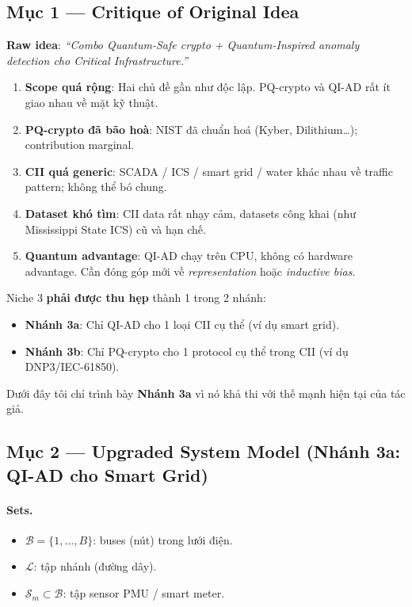 \documentclass[11pt,a4paper]{article}
\begin{document}
\subsection{Mục 1 --- Critique of Original Idea}

\textbf{Raw idea}: \textit{``Combo Quantum-Safe crypto + Quantum-Inspired anomaly detection cho Critical Infrastructure.''}

\begin{critique}
\begin{enumerate}
  \item \textbf{Scope quá rộng}: Hai chủ đề gần như độc lập. PQ-crypto và QI-AD rất ít giao nhau về mặt kỹ thuật.
  \item \textbf{PQ-crypto đã bão hoà}: NIST đã chuẩn hoá (Kyber, Dilithium\dots); contribution marginal.
  \item \textbf{CII quá generic}: SCADA / ICS / smart grid / water khác nhau về traffic pattern; không thể bó chung.
  \item \textbf{Dataset khó tìm}: CII data rất nhạy cảm, datasets công khai (như Mississippi State ICS) cũ và hạn chế.
  \item \textbf{Quantum advantage}: QI-AD chạy trên CPU, không có hardware advantage. Cần đóng góp mới về \textit{representation} hoặc \textit{inductive bias}.
\end{enumerate}
\end{critique}

\begin{critique}
Niche 3 \textbf{phải được thu hẹp} thành 1 trong 2 nhánh:
\begin{itemize}
  \item \textbf{Nhánh 3a}: Chỉ QI-AD cho 1 loại CII cụ thể (ví dụ smart grid).
  \item \textbf{Nhánh 3b}: Chỉ PQ-crypto cho 1 protocol cụ thể trong CII (ví dụ DNP3/IEC-61850).
\end{itemize}
Dưới đây tôi chỉ trình bày \textbf{Nhánh 3a} vì nó khả thi với thế mạnh hiện tại của tác giả.
\end{critique}

\subsection{Mục 2 --- Upgraded System Model (Nhánh 3a: QI-AD cho Smart Grid)}

\paragraph{Sets.}
\begin{itemize}
  \item $\mathcal{B} = \{1, \dots, B\}$: buses (nút) trong lưới điện.
  \item $\mathcal{L}$: tập nhánh (đường dây).
  \item $\mathcal{S}_m \subset \mathcal{B}$: tập sensor PMU / smart meter.
\end{itemize}
\end{document}
